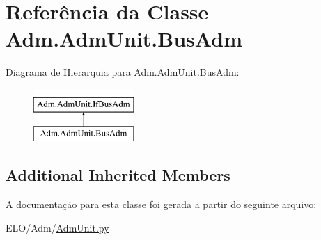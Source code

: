 \hypertarget{classAdm_1_1AdmUnit_1_1BusAdm}{\section{Referência da Classe Adm.\-Adm\-Unit.\-Bus\-Adm}
\label{de/de0/classAdm_1_1AdmUnit_1_1BusAdm}
}
Diagrama de Hierarquia para Adm.\-Adm\-Unit.\-Bus\-Adm\-:\begin{figure}[H]
\begin{center}
\leavevmode
\includegraphics[height=2.000000cm]{de/de0/classAdm_1_1AdmUnit_1_1BusAdm}
\end{center}
\end{figure}
\subsection*{Additional Inherited Members}


A documentação para esta classe foi gerada a partir do seguinte arquivo\-:\begin{DoxyCompactItemize}
\item 
E\-L\-O/\-Adm/\hyperlink{AdmUnit_8py}{Adm\-Unit.\-py}\end{DoxyCompactItemize}
